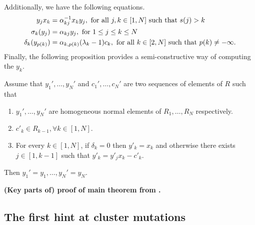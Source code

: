 Additionally, we have the following equations.
\begin{align}\label{eq:y_x_quasi_commute}
	y_j x_k            & = \alpha_{kj}^{-1} x_k y_j, \text{ for all } j, k \in [1, N] \text{ such that } s(j) > k                                             \\
	\sigma_k (y_j)     & = \alpha_{kj}y_j, \text{ for } 1 \leq j \leq k \leq N \label{eq:sigma_of_y}                                                         \\
	\delta_k(y_{p(k)}) & = \alpha_{k, p(k)}(\lambda_k - 1)c_k, \text{ for all } k \in [2, N] \text{ such that } p(k) \neq - \infty \label{eq:delta_of_y_pk}.
\end{align}
%
Finally, the following proposition provides a semi-constructive way of computing the
$y_k$.
\begin{proposition}
	Assume that $y_1', \dots, y_N'$ and $c_1',\dots, c_N'$ are two sequences of elements of $R$ such that
	\begin{enumerate}
		\item $y_1', \dots, y_N'$ are homogeneous normal elements of $R_1, \dots, R_N$ respectively.
		\item $c'_k \in R_{k-1}, \forall k \in [1, N]$.
		\item For every $k \in [1, N]$, if $\delta_k = 0$ then $y'_k = x_k$ and otherwise there
		      exists $j \in [1, k-1]$ such that $y'_k = y'_j x_k - c'_k$.
	\end{enumerate}
	Then $y_1' = y_1, \dots, y_N' = y_N$.
\end{proposition}

\textbf{(Key parts of) proof of main theorem from \cite{GoodearlYakimov2017QCA}.}

\subsection{The first hint at cluster mutations}

